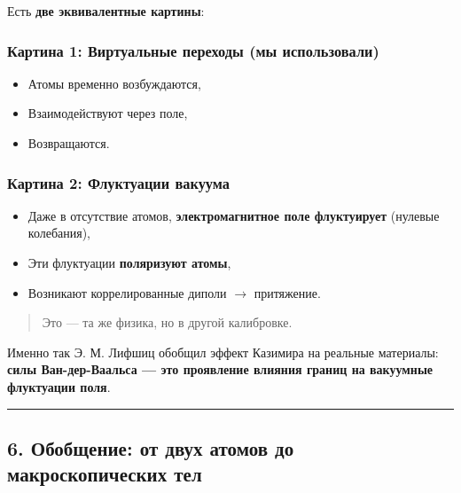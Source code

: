 \documentclass[11pt]{article}
\providecommand{\tightlist}{%
      \setlength{\itemsep}{0pt}\setlength{\parskip}{0pt}}
\begin{document}
Есть \textbf{две эквивалентные картины}:

\subsubsection{\texorpdfstring{Картина 1: \textbf{Виртуальные переходы}
(мы
использовали)}{Картина 1: Виртуальные переходы (мы использовали)}}\label{ux43aux430ux440ux442ux438ux43dux430-1-ux432ux438ux440ux442ux443ux430ux43bux44cux43dux44bux435-ux43fux435ux440ux435ux445ux43eux434ux44b-ux43cux44b-ux438ux441ux43fux43eux43bux44cux437ux43eux432ux430ux43bux438}

\begin{itemize}
\tightlist
\item
  Атомы временно возбуждаются,
\item
  Взаимодействуют через поле,
\item
  Возвращаются.
\end{itemize}

\subsubsection{\texorpdfstring{Картина 2: \textbf{Флуктуации
вакуума}}{Картина 2: Флуктуации вакуума}}\label{ux43aux430ux440ux442ux438ux43dux430-2-ux444ux43bux443ux43aux442ux443ux430ux446ux438ux438-ux432ux430ux43aux443ux443ux43cux430}

\begin{itemize}
\tightlist
\item
  Даже в отсутствие атомов, \textbf{электромагнитное поле флуктуирует}
  (нулевые колебания),
\item
  Эти флуктуации \textbf{поляризуют атомы},
\item
  Возникают коррелированные диполи $\rightarrow$ притяжение.
\end{itemize}

\begin{quote}
Это --- та же физика, но в другой калибровке.
\end{quote}

Именно так Э. М. Лифшиц обобщил эффект Казимира на реальные материалы:
\textbf{силы Ван-дер-Ваальса --- это проявление влияния границ на
вакуумные флуктуации поля}.

\begin{center}\rule{0.5\linewidth}{\linethickness}\end{center}

\subsection{6. Обобщение: от двух атомов до макроскопических
тел}\label{ux43eux431ux43eux431ux449ux435ux43dux438ux435-ux43eux442-ux434ux432ux443ux445-ux430ux442ux43eux43cux43eux432-ux434ux43e-ux43cux430ux43aux440ux43eux441ux43aux43eux43fux438ux447ux435ux441ux43aux438ux445-ux442ux435ux43b}
\end{document}
